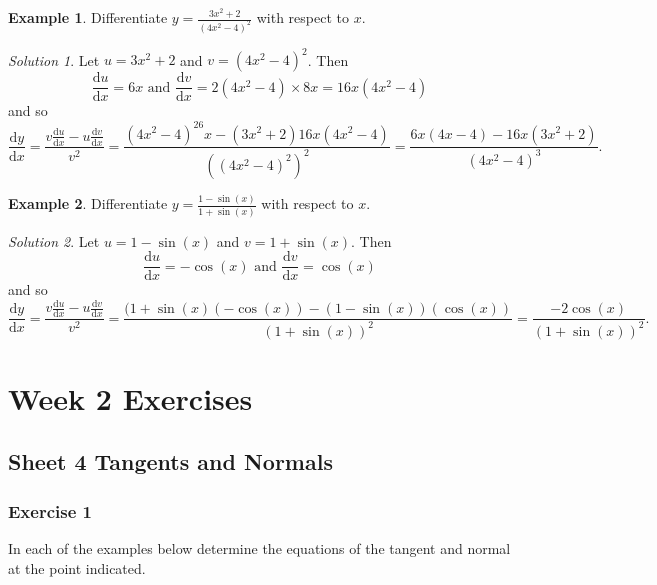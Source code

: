 \documentclass[
  english,
  11pt,
  oneside]{book}
\newcommand{\slide}{}
\theoremstyle{definition}
\theoremstyle{definition}
\newtheorem{example}{Example}[chapter]
\theoremstyle{definition}
\theoremstyle{definition}
\theoremstyle{remark}
\newtheorem*{solution}{Solution}
\begin{document}
\begin{example}
Differentiate \(y=\frac{3x^2+2}{(4x^2-4)^2}\) with respect to \(x\).
\end{example}

\begin{solution}
Let \(u = 3x^2+2\) and \(v = (4x^2-4)^2\).
Then
\[
\frac{\mathrm{d} u}{\mathrm{d} x} = 6x\text{ and }\frac{\mathrm{d} v}{\mathrm{d} x} = 2(4x^2-4)\times8x = 16x(4x^2-4)
\]
and so
\[
\frac{\mathrm{d} y}{\mathrm{d} x} = \frac{v\frac{\mathrm{d} u}{\mathrm{d} x}-u\frac{\mathrm{d} v}{\mathrm{d} x}}{v^2} = \frac{(4x^2-4)^26x - (3x^2+2)16x(4x^2-4)}{((4x^2-4)^2)^2} = \frac{6x(4x-4)-16x(3x^2+2)}{(4x^2-4)^3}.
\]
\end{solution}

\slide

\begin{example}
Differentiate \(y=\frac{1-\sin(x)}{1+\sin(x)}\) with respect to \(x\).
\end{example}

\begin{solution}
Let \(u = 1-\sin(x)\) and \(v = 1+\sin(x)\).
Then
\[
\frac{\mathrm{d} u}{\mathrm{d} x} = -\cos(x)\text{ and }\frac{\mathrm{d} v}{\mathrm{d} x} = \cos(x) 
\]
and so
\[
\frac{\mathrm{d} y}{\mathrm{d} x} = \frac{v\frac{\mathrm{d} u}{\mathrm{d} x}-u\frac{\mathrm{d} v}{\mathrm{d} x}}{v^2} = \frac{(1+\sin(x)(-\cos(x))-(1-\sin(x))(\cos(x))}{(1+\sin(x))^2} = \frac{-2\cos(x)}{(1+\sin(x))^2}.
\]
\end{solution}

\chapter*{Week 2 Exercises}\label{week-2-exercises}

\section{Sheet 4 Tangents and Normals}\label{sheet-4-tangents-and-normals}

\subsection*{Exercise 1}\label{exercise-1-1}

In each of the examples below determine the equations of the tangent and normal at the point indicated.
\end{document}
